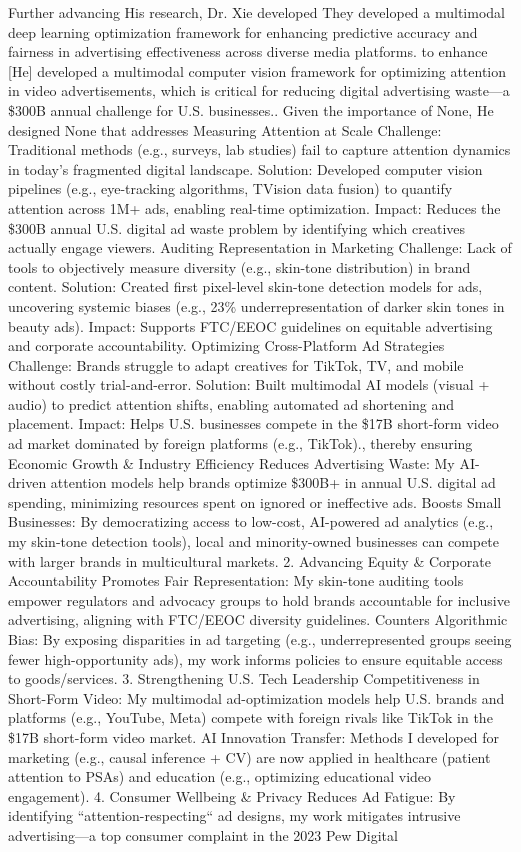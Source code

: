 \documentclass{article}
\begin{document}
Further advancing His research, Dr. Xie developed They developed a multimodal deep learning optimization framework for enhancing predictive accuracy and fairness in advertising effectiveness across diverse media platforms. to enhance [He] developed a multimodal computer vision framework for optimizing attention in video advertisements, which is critical for reducing digital advertising waste—a \$300B annual challenge for U.S. businesses.. Given the importance of None, He designed None that addresses Measuring Attention at Scale  Challenge: Traditional methods (e.g., surveys, lab studies) fail to capture attention dynamics in today’s fragmented digital landscape.  Solution: Developed computer vision pipelines (e.g., eye-tracking algorithms, TVision data fusion) to quantify attention across 1M+ ads, enabling real-time optimization.  Impact: Reduces the \$300B annual U.S. digital ad waste problem by identifying which creatives actually engage viewers.  Auditing Representation in Marketing  Challenge: Lack of tools to objectively measure diversity (e.g., skin-tone distribution) in brand content.  Solution: Created first pixel-level skin-tone detection models for ads, uncovering systemic biases (e.g., 23\% underrepresentation of darker skin tones in beauty ads).  Impact: Supports FTC/EEOC guidelines on equitable advertising and corporate accountability.  Optimizing Cross-Platform Ad Strategies  Challenge: Brands struggle to adapt creatives for TikTok, TV, and mobile without costly trial-and-error.  Solution: Built multimodal AI models (visual + audio) to predict attention shifts, enabling automated ad shortening and placement.  Impact: Helps U.S. businesses compete in the \$17B short-form video ad market dominated by foreign platforms (e.g., TikTok)., thereby ensuring  Economic Growth \& Industry Efficiency  Reduces Advertising Waste: My AI-driven attention models help brands optimize \$300B+ in annual U.S. digital ad spending, minimizing resources spent on ignored or ineffective ads.  Boosts Small Businesses: By democratizing access to low-cost, AI-powered ad analytics (e.g., my skin-tone detection tools), local and minority-owned businesses can compete with larger brands in multicultural markets.  2. Advancing Equity \& Corporate Accountability  Promotes Fair Representation: My skin-tone auditing tools empower regulators and advocacy groups to hold brands accountable for inclusive advertising, aligning with FTC/EEOC diversity guidelines.  Counters Algorithmic Bias: By exposing disparities in ad targeting (e.g., underrepresented groups seeing fewer high-opportunity ads), my work informs policies to ensure equitable access to goods/services.  3. Strengthening U.S. Tech Leadership  Competitiveness in Short-Form Video: My multimodal ad-optimization models help U.S. brands and platforms (e.g., YouTube, Meta) compete with foreign rivals like TikTok in the \$17B short-form video market.  AI Innovation Transfer: Methods I developed for marketing (e.g., causal inference + CV) are now applied in healthcare (patient attention to PSAs) and education (e.g., optimizing educational video engagement).  4. Consumer Wellbeing \& Privacy  Reduces Ad Fatigue: By identifying ``attention-respecting`` ad designs, my work mitigates intrusive advertising—a top consumer complaint in the 2023 Pew Digital 
\end{document}

